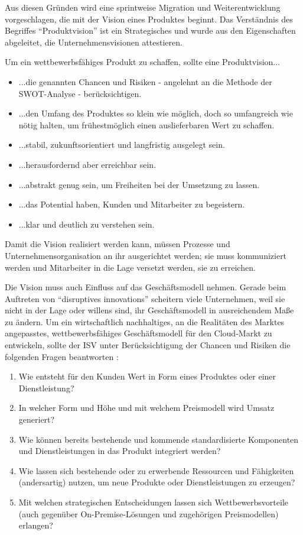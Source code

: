 Aus diesen Gründen wird eine sprintweise Migration und 
Weiterentwicklung vorgeschlagen, die mit der Vision eines Produktes beginnt. 
Das Verständnis des Begriffes "`Produktvision"' ist ein Strategisches und wurde 
aus den Eigenschaften abgeleitet, die  
Unternehmensvisionen attestieren.

Um ein wettbewerbsfähiges Produkt zu schaffen, sollte eine Produktvision...
\begin{itemize}
	\item ...die genannten Chancen und Risiken - angelehnt an die 
Methode der 
SWOT-Analyse  - berücksichtigen. 
	\item ...den Umfang des Produktes so klein wie möglich, doch so 
umfangreich wie nötig halten, um frühestmöglich einen auslieferbaren Wert zu 
schaffen.
	\item ...stabil, zukunftsorientiert und langfristig ausgelegt sein.
	\item ...herausfordernd aber erreichbar sein.
	\item ...abstrakt genug sein, um Freiheiten bei der Umsetzung zu 
lassen.
	\item ...das Potential haben, Kunden und Mitarbeiter zu begeistern.
	\item ...klar und deutlich zu verstehen sein.
\end{itemize}
Damit die Vision realisiert werden kann, müssen Prozesse und 
Unternehmensorganisation an ihr ausgerichtet werden; sie muss kommuniziert 
werden und Mitarbeiter in die Lage versetzt werden, sie zu erreichen. 

Die Vision muss auch Einfluss auf das Geschäftsmodell nehmen. Gerade beim 
Auftreten von "`disruptives innovations"' scheitern viele Unternehmen, 
weil sie nicht in der Lage oder willens sind, ihr Geschäftsmodell in 
ausreichendem Maße zu ändern. 
 Um ein 
wirtschaftlich nachhaltiges, an die Realitäten des Marktes angepasstes, 
wettbewerbsfähiges Geschäftsmodell für den Cloud-Markt zu entwickeln, sollte 
der ISV unter Berücksichtigung der Chancen und Risiken die folgenden Fragen 
beantworten :
\begin{enumerate}
	\item Wie entsteht für den Kunden Wert in Form eines Produktes oder 
		einer Dienstleistung?
	\item In welcher Form und Höhe und mit welchem Preismodell wird Umsatz 
generiert? 
	\item Wie können bereits bestehende und kommende standardisierte 
Komponenten und Dienstleistungen in das Produkt integriert werden?
	\item Wie lassen sich bestehende oder zu erwerbende Ressourcen und 
Fähigkeiten (andersartig) nutzen, um neue Produkte oder Dienstleistungen zu 
erzeugen?
	\item Mit welchen strategischen Entscheidungen lassen sich 
Wettbewerbsvorteile (auch gegenüber On-Premise-Lösungen und 
zugehörigen Preismodellen) erlangen?
\end{enumerate}

